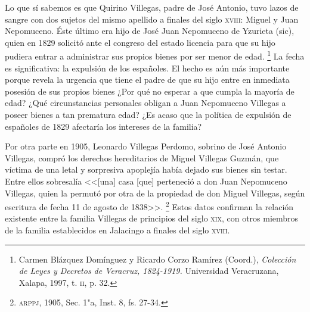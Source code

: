 \documentclass[14pt,twoside,final]{extbook} %
\let\oldfootnote\footnote
\renewcommand\footnote[1]{%
\oldfootnote{\hspace{1mm}#1}}
\begin{document}
Lo que sí sabemos es que Quirino Villegas, padre de José Antonio, tuvo lazos de sangre con dos sujetos del mismo apellido a finales del siglo \textsc{xviii}: Miguel y Juan Nepomuceno. Éste último era hijo de José Juan Nepomuceno de Yzurieta (sic), quien en 1829 solicitó ante el congreso del estado licencia para que su hijo pudiera entrar a administrar sus propios bienes por ser menor de edad.\footnote{Carmen Blázquez Domínguez y Ricardo Corzo Ramírez (Coord.), \emph{Colección de Leyes y Decretos de Veracruz, 1824-1919.} Universidad Veracruzana, Xalapa, 1997, t. \textsc{ii}, p. 32.} La fecha es significativa: la expulsión de los españoles. El hecho es aún más importante porque revela la urgencia que tiene el padre de que su hijo entre en inmediata posesión de sus propios bienes ¿Por qué no esperar a que cumpla la mayoría de edad? ¿Qué circunstancias personales obligan a Juan Nepomuceno Villegas a poseer bienes a tan prematura edad? ¿Es acaso que la política de expulsión de españoles de 1829 afectaría los intereses de la familia?

Por otra parte en 1905, Leonardo Villegas Perdomo, sobrino de José Antonio Villegas, compró los derechos hereditarios de Miguel Villegas Guzmán, que víctima de una letal y sorpresiva apoplejía había dejado sus bienes sin testar. Entre ellos sobresalía <<[una] casa [que] perteneció a don Juan Nepomuceno Villegas, quien la permutó por otra de la propiedad de don Miguel Villegas, según escritura de fecha 11 de agosto de 1838>>.\footnote{\textsc{arppj}, 1905, Sec. 1"a, Inst. 8, fs. 27-34.} Estos datos confirman la relación existente entre la familia Villegas de principios del siglo \textsc{xix}, con otros miembros de la familia establecidos en Jalacingo a finales del siglo \textsc{xviii}.
\end{document}
